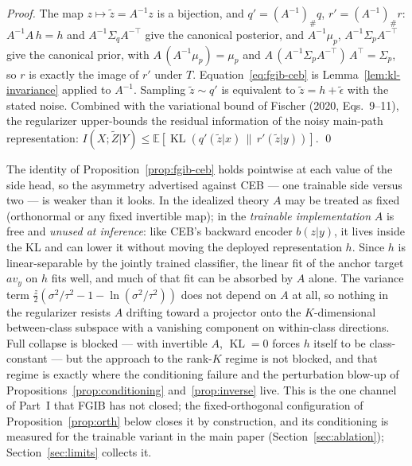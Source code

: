 \begin{proof}
The map $z \mapsto \tilde{z} = A^{-1}z$ is a bijection, and
$q' = (A^{-1})_\# q$, $r' = (A^{-1})_\# r$:
$A^{-1}A\,h = h$ and $A^{-1}\Sigma_q A^{-\top}$ give the canonical posterior, and
$A^{-1}\mu_p$, $A^{-1}\Sigma_p A^{-\top}$ give the canonical prior, with
$A\,(A^{-1}\mu_p) = \mu_p$ and $A\,(A^{-1}\Sigma_p A^{-\top})\,A^{\top}
= \Sigma_p$, so $r$ is exactly the image of $r'$ under $T$.
Equation~\eqref{eq:fgib-ceb} is Lemma~\ref{lem:kl-invariance} applied to $A^{-1}$.
Sampling $\tilde{z} \sim q'$ is equivalent to
$\tilde{z} = h + \tilde{\epsilon}$ with the stated noise.
Combined with the variational bound of Fischer (2020, Eqs.~9--11), the regularizer
upper-bounds the residual information of the noisy main-path representation:
$I(X;\tilde{Z}|Y) \le \mathbb{E}[\operatorname{KL}(q'(\tilde{z}|x)\,\|\,r'(\tilde{z}|y))]$.
\hfill\qed
\end{proof}

\begin{remark}\label{rem:A-channel}
The identity of Proposition~\ref{prop:fgib-ceb} holds pointwise at each value of the
side head, so the asymmetry advertised against CEB --- one trainable side versus two ---
is weaker than it looks. In the idealized theory $A$ may be treated as fixed
(orthonormal or any fixed invertible map); in the \emph{trainable implementation} $A$ is
free and \emph{unused at inference}:
like CEB's backward encoder $b(z|y)$, it lives inside the KL and can lower it without
moving the deployed representation $h$. Since $h$ is linear-separable by the jointly
trained classifier, the linear fit of the anchor target $a v_y$ on $h$ fits well, and
much of that fit can be absorbed by $A$ alone. The variance term
$\tfrac{z}{2}(\sigma^2/\tau^2 - 1 - \ln(\sigma^2/\tau^2))$ does not depend on $A$ at
all, so nothing in
the regularizer resists $A$ drifting toward a projector onto the $K$-dimensional
between-class subspace with a vanishing component on within-class directions. Full
collapse is blocked --- with invertible $A$, $\operatorname{KL} = 0$ forces $h$ itself
to be class-constant --- but the approach to the rank-$K$ regime is not blocked, and
that regime is exactly where the conditioning failure and the perturbation blow-up of
Propositions~\ref{prop:conditioning} and~\ref{prop:inverse} live. This is the one
channel of Part~I that FGIB has not closed; the fixed-orthogonal configuration of
Proposition~\ref{prop:orth} below closes it by construction, and its conditioning is
measured for the trainable variant in the main paper
(Section~\ref{sec:ablation}); Section~\ref{sec:limits} collects it.
\end{remark}

